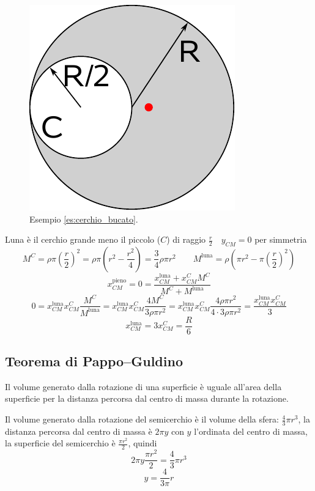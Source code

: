 \begin{Es}
\label{es:cerchio_bucato}
\begin{figure}[htp]
 \centering
 \includegraphics[scale=0.7]{immagini/fisica1/luna}
 \caption{Esempio \ref{es:cerchio_bucato}.}
\end{figure}

Luna è il cerchio grande meno il piccolo ($C$) di raggio
$\frac{r}{2} \quad y_{CM}=0$ per simmetria
\[M^C=\rho\pi\left(\frac{r}{2}\right)^2=\rho\pi\left(r^2-\frac{r^2}{4}\right)=\frac{3}{4}\rho\pi r^2\qquad M^{\text{luna}}=\rho\left(\pi r^2-\pi\left(\frac{r}{2}\right)^2\right)\]
\[x_{CM}^{\text{pieno}}=0=\frac{x_{CM}^{\text{luna}}+x_{CM}^CM^C}{M^C+M^{\text{luna}}}\]
\[0=x_{CM}^{\text{luna}}x_{CM}^C\frac{M^C}{M^{\text{luna}}}=x_{CM}^{\text{luna}}x_{CM}^C\frac{4M^C}{3\rho \pi r^2}=x_{CM}^{\text{luna}}x_{CM}^C\frac{4\rho\pi r^2}{4\cdot 3\rho\pi r^2}=\frac{x_{CM}^{\text{luna}}x_{CM}^C}{3}\]
\[x_{CM}^{\text{luna}}=3x_{CM}^C=\frac{R}{6}\]
\end{Es}

\subsection{Teorema di Pappo--Guldino}
\begin{Teo}
Il volume generato dalla rotazione di una superficie è uguale
all'area della superficie per la distanza percorsa dal centro di
massa durante la rotazione.
\end{Teo}
\begin{Es}[Semicerchio]
Il volume generato dalla rotazione del semicerchio è il volume della
sfera: $\frac{4}{3}\pi r^3$, la distanza percorsa dal centro di
massa è $2\pi y$ con $y$ l'ordinata del centro di massa, la
superficie del semicerchio è $\frac{\pi r^2}{2}$, quindi
\[2\pi y\frac{\pi r^2}{2}=\frac{4}{3}\pi r^3\]
\[y=\frac{4}{3\pi}r\]
\end{Es}

